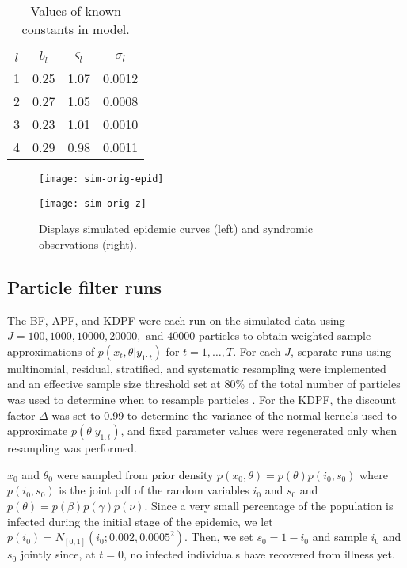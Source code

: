 \documentclass{elsarticle}
\begin{document}
\begin{table}[ht]
\begin{center}
\caption{Values of known constants in model.}
\label{tab:constants}
\begin{tabular}{|cccc|}
\hline
$l$ & $b_l$ & $\varsigma_l$ & $\sigma_l$ \\
\hline
1 & 0.25 & 1.07 & 0.0012 \\
2 & 0.27 & 1.05 & 0.0008 \\
3 & 0.23 & 1.01 & 0.0010 \\
4 & 0.29 & 0.98 & 0.0011 \\
\hline
\end{tabular}
\end{center}
\end{table}

\begin{figure}
\centering
\begin{minipage}{0.48\linewidth}
\texttt{[image: sim-orig-epid]}
\end{minipage}
\begin{minipage}{0.48\linewidth}
\texttt{[image: sim-orig-z]}
\end{minipage}
\caption{Displays simulated epidemic curves (left) and syndromic observations (right).} \label{fig:data}
\end{figure}

\subsection{Particle filter runs} \label{sec:pf}

The BF, APF, and KDPF were each run on the simulated data using $J = 100, 1000, 10000, 20000, \mbox{ and } 40000$ particles to obtain weighted sample approximations of $p(x_t,\theta|y_{1:t})$ for $t = 1,\ldots,T$. For each $J$, separate runs using multinomial, residual, stratified, and systematic resampling were implemented and an effective sample size threshold set at 80\% of the total number of particles was used to determine when to resample particles \citep{Liu:Chen:Wong:reje:1998}. For the KDPF, the discount factor $\Delta$ was set to 0.99 to determine the variance of the normal kernels used to approximate $p(\theta|y_{1:t})$, and fixed parameter values were regenerated only when resampling was performed.

$x_0$ and $\theta_0$ were sampled from prior density $p(x_0,\theta) = p(\theta)p(i_0,s_0)$ where $p(i_0,s_0)$ is the joint pdf of the random variables $i_0$ and $s_0$ and $p(\theta) = p(\beta)p(\gamma)p(\nu)$. Since a very small percentage of the population is infected during the initial stage of the epidemic, we let $p(i_0) = N_{[0,1]}(i_0;0.002,0.0005^2)$. Then, we set $s_0 = 1 - i_0$ and sample $i_0$ and $s_0$ jointly since, at $t = 0$, no infected individuals have recovered from illness yet.
\end{document}

